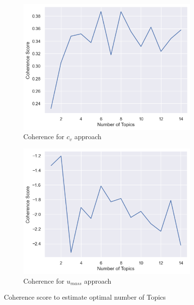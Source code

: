 \documentclass[sn-mathphys,Numbered]{sn-jnl}%
\theoremstyle{thmstyleone}%
\theoremstyle{thmstyletwo}%
\theoremstyle{thmstylethree}%
\begin{document}
\begin{figure}[h!]
\centering
\begin{subfigure}{0.45\textwidth}
    \includegraphics[width=\textwidth]{cv.png}
    \caption{Coherence for $c_v$ approach}
    \label{cv}
\end{subfigure}
\hfill
\begin{subfigure}{0.45\textwidth}
    \includegraphics[width=\textwidth]{umass.png}
    \caption{Coherence for $u_{mass}$ approach}
    \label{umass}
\end{subfigure}       
\caption{Coherence score to estimate optimal number of Topics}
\label{cv_umass}
\end{figure}
\end{document}
